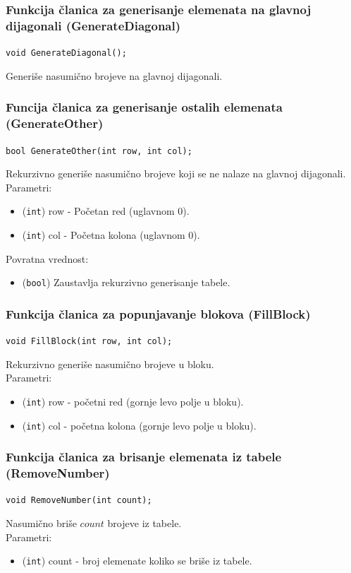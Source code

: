 \documentclass[a4paper]{article}
\begin{document}
    \subsubsection{Funkcija članica za generisanje elemenata na glavnoj dijagonali (GenerateDiagonal)}
	\texttt{void GenerateDiagonal();}
	\par Generiše nasumično brojeve na glavnoj dijagonali.

    \subsubsection{Funcija članica za generisanje ostalih elemenata (GenerateOther)}
    \texttt{bool GenerateOther(int row, int col);}
    \par Rekurzivno generiše nasumično brojeve koji se ne nalaze na glavnoj dijagonali.\\
	Parametri:
    \begin{itemize}
        \item (\texttt{int}) row - Početan red (uglavnom 0).
        \item (\texttt{int}) col - Početna kolona (uglavnom 0).
    \end{itemize}
    Povratna vrednost:
    \begin{itemize}
        \item (\texttt{bool}) Zaustavlja rekurzivno generisanje tabele.
    \end{itemize}
    
    \subsubsection{Funkcija članica za popunjavanje blokova (FillBlock)}
    \texttt{void FillBlock(int row, int col);}
    \par Rekurzivno generiše nasumično brojeve u bloku.\\
    Parametri:
    \begin{itemize}
        \item (\texttt{int}) row - početni red (gornje levo polje u bloku).
        \item (\texttt{int}) col - početna kolona (gornje levo polje u bloku).
    \end{itemize}

    \subsubsection{Funkcija članica za brisanje elemenata iz tabele (RemoveNumber)}
	\texttt{void RemoveNumber(int count);}
    \par Nasumično briše $count$ brojeve iz tabele.\\
    Parametri:
    \begin{itemize}
        \item (\texttt{int}) count - broj elemenate koliko se briše iz tabele.
    \end{itemize}
\end{document}
